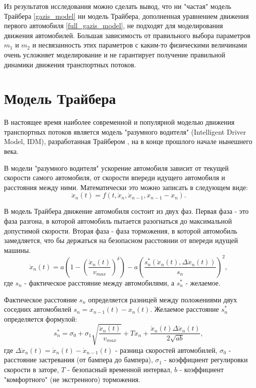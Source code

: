 \documentclass[12pt, a4paper]{extarticle}
\numberwithin{equation}{section}
\begin{document}
Из результатов исследования можно сделать вывод, что ни "частая" модель Трайбера \eqref{gazis_model} ни модель Трайбера, дополненная уравнением движения первого автомобиля \eqref{full_gazis_model}, не подходят для моделирования движения автомобилей. Большая зависимость от правильного выбора параметров $m_1$ и $m_2$ и несвязанность этих параметров с каким-то физическими величинами очень усложняет моделирование и не гарантирует получение правильной динамики движения транспортных потоков. 

\section{Модель Трайбера}
В настоящее время наиболее современной и популярной моделью движения транспортных потоков является модель "разумного водителя" (Intelligent Driver Model, IDM), разработанная Трайбером \cite{TreiberModel_1}, \cite{TreiberModel_2} на в конце прошлого начале нынешнего века. 

В модели "разумного водителя" ускорение автомобиля зависит от текущей скорости самого автомобиля, от скорости впереди идущего автомобиля и расстояния между ними. Математически это можно записать в следующем виде:
\begin{equation*}
\ddot{x}_n(t)=f(t, \dot{x}_n,\dot{x}_{n-1}, x_{n-1}-x_n).
\end{equation*} 

В модель Трайбера движение автомобиля состоит из двух фаз. Первая фаза - это фаза разгона, в которой автомобиль пытается разогнаться до максимальной допустимой скорости. Вторая фаза - фаза торможения, в которой автомобиль замедляется, что бы держаться на безопасном расстоянии от впереди идущей машины.
\begin{equation} \label{treiber_model}
\ddot{x}_n(t)= a\left( 1-\left( \dfrac{\dot{x}_n(t)}{v_{max}}\right)^\delta \right) - a\left( \dfrac{s^*_n(\dot{x}_n(t),\Delta \dot{x}_n(t))}{s_n}\right)^2,
\end{equation}
где $s_n$ - фактическое расстояние между автомобилями, а $s^*_n$ - желаемое.

Фактическое расстояние $s_n$ определяется разницей между положениями двух соседних автомобилей $s_n=x_{n-1}(t)-x_n(t)$. Желаемое расстояние  $s^*_n$ определяется формулой:
\begin{equation*}
s^*_n = \sigma_0+\sigma_1\sqrt{\dfrac{ \dot{x}_n(t)}{v_{max}}} +T \dot{x}_n+ \dfrac{ \dot{x}_n(t)\Delta \dot{x}_n(t) }{2\sqrt{ab}},
\end{equation*}
где $\Delta \dot{x}_n(t) = \dot{x}_n(t)- \dot{x}_{n-1}(t)$ - разница скоростей автомобилей, $\sigma_0$ - расстояние застревания (от бампера до бампера), $\sigma_1$ - коэффициент регулировки скорости в заторе, $T$ - безопасный временной интервал, $b$ - коэффициент "комфортного" (не экстренного) торможения.
\end{document}
